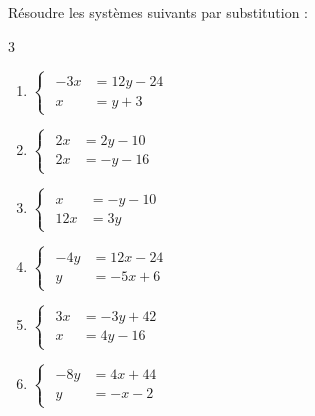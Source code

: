 {%
\begin{Exercice}
Résoudre les systèmes suivants par substitution :
\begin{multicols}{3}
\begin{enumerate}[itemsep=1em]
	\item \begin{minipage}[t]{\linewidth}$\begin{cases}\begin{aligned}-3x &=12y-24\\x &=y+3\end{aligned}\end{cases}$\end{minipage}
	\item \begin{minipage}[t]{\linewidth}$\begin{cases}\begin{aligned}2x &=2y-10\\2x &=-y-16\end{aligned}\end{cases}$\end{minipage}
	\item \begin{minipage}[t]{\linewidth}$\begin{cases}\begin{aligned}x &=-y-10\\12x &=3y\end{aligned}\end{cases}$\end{minipage}
	\item \begin{minipage}[t]{\linewidth}$\begin{cases}\begin{aligned}-4y &=12x-24\\y &=-5x+6\end{aligned}\end{cases}$\end{minipage}
	\item \begin{minipage}[t]{\linewidth}$\begin{cases}\begin{aligned}3x &=-3y+42\\x &=4y-16\end{aligned}\end{cases}$\end{minipage}
	\item \begin{minipage}[t]{\linewidth}$\begin{cases}\begin{aligned}-8y &=4x+44\\y &=-x-2\end{aligned}\end{cases}$\end{minipage}
\end{enumerate}
\end{multicols}
\end{Exercice}

}
